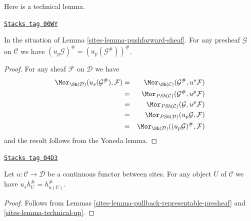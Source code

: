 Here is a technical lemma.

\begin{lemma}[Technical up]
\label{sites-lemma-technical-up}
\href{https://stacks.math.columbia.edu/tag/00WY}{\texttt{Stacks tag 00WY}}

In the situation of Lemma \ref{sites-lemma-pushforward-sheaf}.
For any presheaf $\mathcal{G}$ on $\mathcal{C}$
we have $(u_p\mathcal{G})^\# = (u_p(\mathcal{G}^\#))^\#$.
\end{lemma}

\begin{proof}
For any sheaf $\mathcal{F}$ on $\mathcal{D}$ we have
\begin{eqnarray*}
\Mor_{\Sh(\mathcal{D})}(u_s(\mathcal{G}^\#), \mathcal{F})
& = &
\Mor_{\Sh(\mathcal{C})}(\mathcal{G}^\#, u^s\mathcal{F}) \\
& = &
\Mor_{\textit{PSh}(\mathcal{C})}(\mathcal{G}^\#, u^p\mathcal{F}) \\
& = &
\Mor_{\textit{PSh}(\mathcal{C})}(\mathcal{G}, u^p\mathcal{F}) \\
& = &
\Mor_{\textit{PSh}(\mathcal{D})}(u_p\mathcal{G}, \mathcal{F}) \\
& = &
\Mor_{\Sh(\mathcal{D})}((u_p\mathcal{G})^\#, \mathcal{F})
\end{eqnarray*}
and the result follows from the Yoneda lemma.
\end{proof}

\begin{lemma}
\label{sites-lemma-pullback-representable-sheaf}
\href{https://stacks.math.columbia.edu/tag/04D3}{\texttt{Stacks tag 04D3}}

Let $u : \mathcal{C} \to \mathcal{D}$ be a continuous functor
between sites.
For any object $U$ of $\mathcal{C}$ we have $u_sh_U^\# = h_{u(U)}^\#$.
\end{lemma}

\begin{proof}

Follows from
Lemmas \ref{sites-lemma-pullback-representable-presheaf}
and \ref{sites-lemma-technical-up}.
\end{proof}


